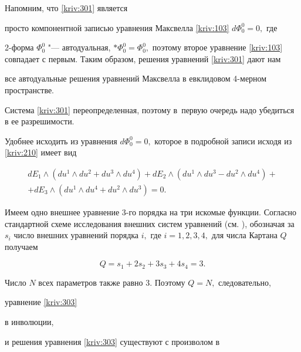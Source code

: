 Напомним, что \eqref{kriv:301} является 

просто компонентной записью уравнения Максвелла \eqref{kriv:103} $d\Phi _{0}^{0}=0,$ где

2-форма $\Phi _{0}^{0}$ "--- автодуальная, $\ast \Phi _{0}^{0}=\Phi _{0}^{0},$ поэтому второе уравнение \eqref{kriv:103} совпадает с первым. Таким образом,  решения уравнений \eqref{kriv:301} дают нам 

все автодуальные решения уравнений Максвелла  в евклидовом 4-мерном пространстве. 

Система \eqref{kriv:301} переопределенная,  поэтому в~первую очередь надо убедиться в ее разрешимости. 

Удобнее исходить из уравнения $d\Phi _{0}^{0}=0,$ которое в подробной записи исходя из \eqref{kriv:210} имеет вид

\begin{multline}


dE_{1}\wedge \left( du^{1}\wedge du^{2}+du^{3}\wedge du^{4}\right)

+dE_{2}\wedge \left( du^{1}\wedge du^{3}-du^{2}\wedge du^{4}\right) + \\ 

+dE_{3}\wedge \left( du^{1}\wedge du^{4}+du^{2}\wedge du^{3}\right) =0.


\label{kriv:303} 

\end{multline}

Имеем одно внешнее уравнение 3-го порядка на три искомые функции. Согласно стандартной схеме исследования внешних систем уравнений (см. \cite{bib:kriv:7}), обозначая за $s_{i}$ число внешних уравнений порядка $i,$ где $i=1,2,3,4,$ для числа Картана $Q$ получаем

\begin{equation*}

Q=s_{1}+2s_{2}+3s_{3}+4s_{4}=3.

\end{equation*}

Число $N$ всех параметров также равно $3.$ Поэтому $Q=N,$ следовательно,  

уравнение \eqref{kriv:303} 

в инволюции, 

и решения уравнения \eqref{kriv:303} существуют с произволом в 

